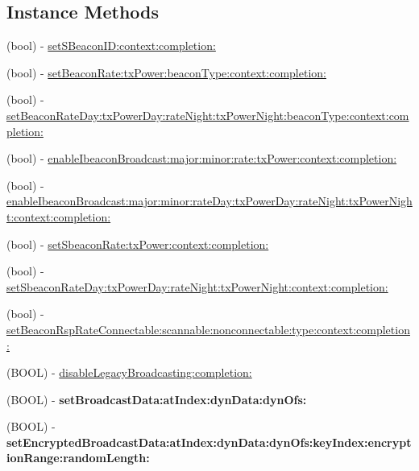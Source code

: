 \subsection*{Instance Methods}
\begin{DoxyCompactItemize}
\item 
(bool) -\/ \hyperlink{interface_le_snf_device_a65a6df0b7a59e48b3370f4411772aae2}{set\+S\+Beacon\+I\+D\+:context\+:completion\+:}
\item 
(bool) -\/ \hyperlink{interface_le_snf_device_a1c6251a5588bfb099fedf668deb81a3e}{set\+Beacon\+Rate\+:tx\+Power\+:beacon\+Type\+:context\+:completion\+:}
\item 
(bool) -\/ \hyperlink{interface_le_snf_device_a6b42f33a33d12fcae1572b845a4eb361}{set\+Beacon\+Rate\+Day\+:tx\+Power\+Day\+:rate\+Night\+:tx\+Power\+Night\+:beacon\+Type\+:context\+:completion\+:}
\item 
(bool) -\/ \hyperlink{interface_le_snf_device_a70c456167e98302dcfdc2e89332198b0}{enable\+Ibeacon\+Broadcast\+:major\+:minor\+:rate\+:tx\+Power\+:context\+:completion\+:}
\item 
(bool) -\/ \hyperlink{interface_le_snf_device_a2b6dcfb3598d0b08c4cd11ed83dbbc34}{enable\+Ibeacon\+Broadcast\+:major\+:minor\+:rate\+Day\+:tx\+Power\+Day\+:rate\+Night\+:tx\+Power\+Night\+:context\+:completion\+:}
\item 
(bool) -\/ \hyperlink{interface_le_snf_device_a324d2225101dd7c4c2063710e96b9a9a}{set\+Sbeacon\+Rate\+:tx\+Power\+:context\+:completion\+:}
\item 
(bool) -\/ \hyperlink{interface_le_snf_device_a93b1c0c6a116ce8b9cd9f89e06ff49b3}{set\+Sbeacon\+Rate\+Day\+:tx\+Power\+Day\+:rate\+Night\+:tx\+Power\+Night\+:context\+:completion\+:}
\item 
(bool) -\/ \hyperlink{interface_le_snf_device_a01df3c1e33aec5783931e242a2ee85fd}{set\+Beacon\+Rsp\+Rate\+Connectable\+:scannable\+:nonconnectable\+:type\+:context\+:completion\+:}
\item 
(B\+O\+O\+L) -\/ \hyperlink{interface_le_snf_device_a8f8ffff42458130c01aa5152cf2f857c}{disable\+Legacy\+Broadcasting\+:completion\+:}
\item 
\hypertarget{interface_le_snf_device_a60f5ee8daa8102dcacc69f1c2d0b413f}{}(B\+O\+O\+L) -\/ {\bfseries set\+Broadcast\+Data\+:at\+Index\+:dyn\+Data\+:dyn\+Ofs\+:}\label{interface_le_snf_device_a60f5ee8daa8102dcacc69f1c2d0b413f}

\item 
\hypertarget{interface_le_snf_device_a0d2108ce33ab51b9b036e232fde740e6}{}(B\+O\+O\+L) -\/ {\bfseries set\+Encrypted\+Broadcast\+Data\+:at\+Index\+:dyn\+Data\+:dyn\+Ofs\+:key\+Index\+:encryption\+Range\+:random\+Length\+:}\label{interface_le_snf_device_a0d2108ce33ab51b9b036e232fde740e6}


\end{DoxyCompactItemize}

